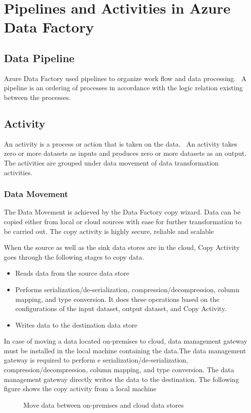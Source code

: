 \documentclass[9pt,twocolumn,twoside]{styles/osajnl}
\begin{document}
\section{Pipelines and Activities in Azure Data Factory}
\subsection{Data Pipeline}
Azure Data Factory used pipelines to organize work flow and data processing.~\cite{www-microsoft-azure-pipelines} A pipeline is an ordering of processes in accordance with the logic relation existing between the processes. 

\subsection{Activity} 
An activity is a process or action that is taken on the data.~\cite{www-microsoft-azure-pipelines} An activity takes zero or more datasets as inputs and produces zero or more datasets as an output. The activities are grouped under data movement of data transformation activities.

\subsubsection{Data Movement}
The Data Movement is achieved by the Data Factory copy wizard. Data can be copied either from local or cloud sources with ease for further transformation to be carried out. The copy activity is highly secure, reliable and scalable

When the source as well as the sink data stores are in the cloud, Copy Activity goes through the following stages to copy data. 
\begin{itemize}
    \item Reads data from the source data store\item Performs serialization/de-serialization, compression/decompression, column mapping, and type conversion. It does these operations based on the configurations of the input dataset, output dataset, and Copy Activity.\item Writes data to the destination data store
\end{itemize}

In case of moving a data located on-premises to cloud, data management gateway must be installed in the local machine containing the data.The data management gateway is required to perform e serialization/de-serialization, compression/decompression, column mapping, and type conversion. The data management gateway directly writes the data to the destination. The following figure shows the copy activity from a local machine
\begin{figure}[htbp]
\centering
{}
\caption{Move data between on-premises and cloud data stores}
\label{fig:copy-local}
\end{figure}
\end{document}
